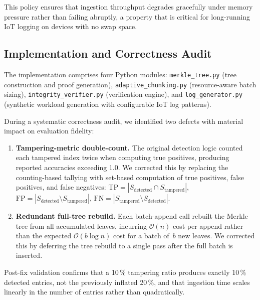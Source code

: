 \documentclass[preprint,12pt]{elsarticle}
\begin{document}
This policy ensures that ingestion throughput degrades gracefully under memory pressure rather than failing abruptly, a property that is critical for long-running IoT logging on devices with no swap space.

\subsection{Implementation and Correctness Audit}
\label{sec:audit}

The implementation comprises four Python modules: \texttt{merkle\_tree.py} (tree construction and proof generation), \texttt{adaptive\_chunking.py} (resource-aware batch sizing), \texttt{integrity\_verifier.py} (verification engine), and \texttt{log\_generator.py} (synthetic workload generation with configurable IoT log patterns).

During a systematic correctness audit, we identified two defects with material impact on evaluation fidelity:

\begin{enumerate}[leftmargin=*, label=\textbf{D\arabic*.}]
  \item \textbf{Tampering-metric double-count.}
    The original detection logic counted each tampered index twice when computing true positives, producing reported accuracies exceeding 1.0.
    We corrected this by replacing the counting-based tallying with set-based computation of true positives, false positives, and false negatives: $\mathrm{TP} = |S_{\text{detected}} \cap S_{\text{tampered}}|$, $\mathrm{FP} = |S_{\text{detected}} \setminus S_{\text{tampered}}|$, $\mathrm{FN} = |S_{\text{tampered}} \setminus S_{\text{detected}}|$.

  \item \textbf{Redundant full-tree rebuild.}
    Each batch-append call rebuilt the Merkle tree from all accumulated leaves, incurring $\mathcal{O}(n)$ cost per append rather than the expected $\mathcal{O}(b \log n)$ cost for a batch of~$b$ new leaves.
    We corrected this by deferring the tree rebuild to a single pass after the full batch is inserted.
\end{enumerate}

Post-fix validation confirms that a 10\,\% tampering ratio produces exactly 10\,\% detected entries, not the previously inflated 20\,\%, and that ingestion time scales linearly in the number of entries rather than quadratically.
\end{document}
